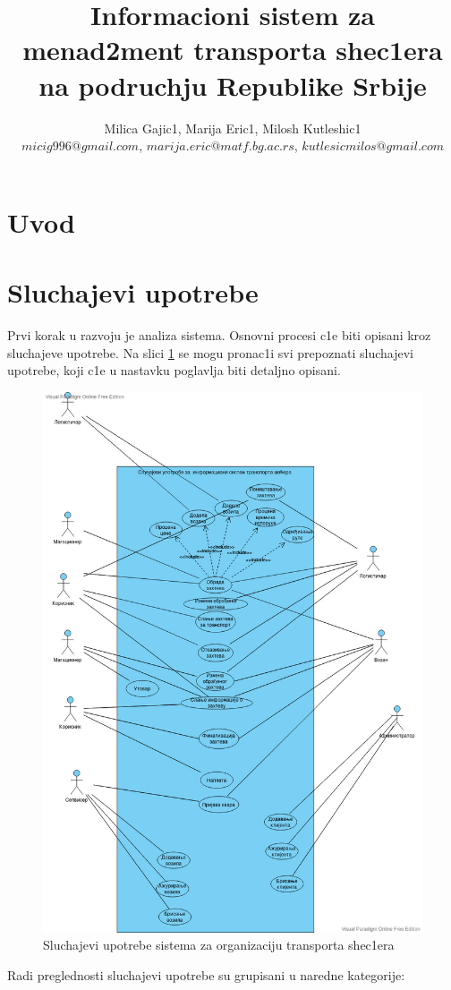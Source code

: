 \documentclass{article}
\title{\textbf{Informacioni sistem za menad2ment transporta shec1era na podruchju Republike Srbije}}
\author{Milica Gajic1, Marija Eric1, Milosh Kutleshic1\\
$micig996@gmail.com$, $marija.eric@matf.bg.ac.rs$, $kutlesicmilos@gmail.com$}
\begin{document}
\maketitle
\newpage


\renewcommand*\contentsname{Sadrz1aj}
\tableofcontents
\newpage

\section{Uvod}


\section{Sluchajevi upotrebe}
Prvi korak u razvoju je analiza sistema. Osnovni procesi c1e biti opisani kroz sluchajeve upotrebe. 
Na slici \ref{sistem} se mogu pronac1i svi prepoznati sluchajevi upotrebe, koji c1e u nastavku poglavlja biti detaljno opisani.
\begin{figure}[H]
    \includegraphics[scale = 0.4]{Slike/UML/SlucajeviUpotrebeSistema.jpg}
    \centering
    \caption{Sluchajevi upotrebe sistema za organizaciju transporta shec1era}
    \label{sistem}
\end{figure}  
Radi preglednosti sluchajevi upotrebe su grupisani u naredne kategorije:
\end{document}

